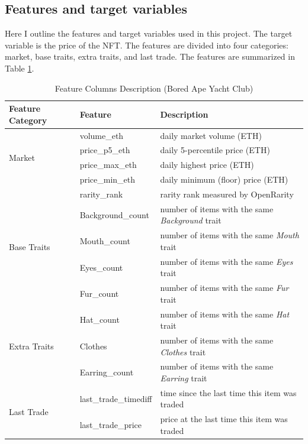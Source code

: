 \documentclass[12pt]{article}
\begin{document}
\subsection{Features and target variables}
Here I outline the features and target variables used in this project. The target variable is the price of the NFT. The features are divided into four categories: market, base traits, extra traits, and last trade. The features are summarized in Table \ref{tab:feature_columns}.
\begin{table}[H]
    \centering
    \begin{tabular}{|l|l|l|}
    \hline
    \textbf{Feature Category} & \textbf{Feature} & \textbf{Description} \\ \hline

    \multirow{4}{*}{Market} & volume\_eth & daily market volume (ETH) \\ \cline{2-3} 
    & price\_p5\_eth & daily 5-percentile price (ETH) \\ \cline{2-3} 
    & price\_max\_eth & daily highest price (ETH) \\ \cline{2-3} 
    & price\_min\_eth & daily minimum (floor) price (ETH)\\ \hline

    \multirow{5}{*}{Base Traits} & rarity\_rank & rarity rank measured by OpenRarity \\ \cline{2-3} 
    & Background\_count & number of items with the same \textit{Background} trait \\ \cline{2-3} 
    & Mouth\_count & number of items with the same \textit{Mouth} trait \\ \cline{2-3} 
    & Eyes\_count & number of items with the same \textit{Eyes} trait\\ \cline{2-3} 
    & Fur\_count & number of items with the same \textit{Fur} trait \\ \hline

    \multirow{3}{*}{Extra Traits} & Hat\_count & number of items with the same \textit{Hat} trait \\ \cline{2-3} 
    & Clothes & number of items with the same \textit{Clothes} trait \\ \cline{2-3} 
    & Earring\_count & number of items with the same \textit{Earring} trait \\ \hline

    \multirow{2}{*}{Last Trade} & last\_trade\_timediff & time since the last time this item was traded \\ \cline{2-3} 
    & last\_trade\_price & price at the last time this item was traded\\ \hline
    \end{tabular}
    \caption{Feature Columns Description (Bored Ape Yacht Club)}
    \label{tab:feature_columns}
\end{table}
    
\end{document}
